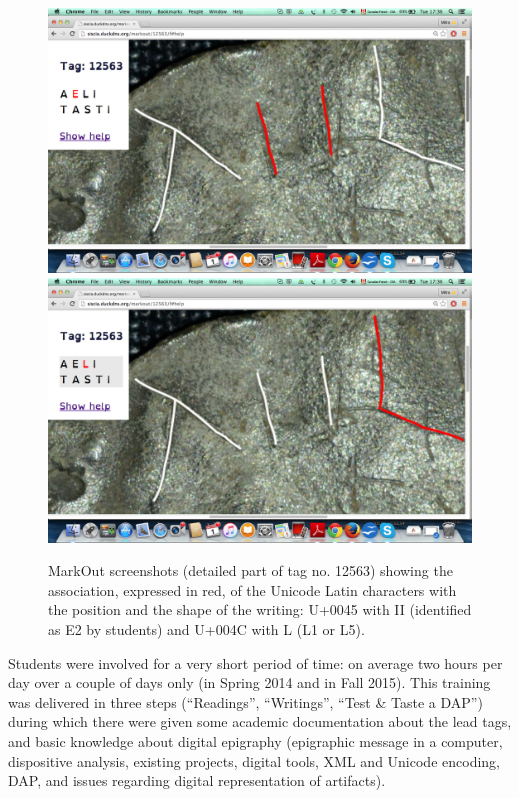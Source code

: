 \documentclass[amsthm,ebook]{saparticle}
\begin{document}
\begin{figure}[!bp]
\centering
\includegraphics[scale=0.10]{EAGLE16lameetalteaching-img003.png}
\includegraphics[scale=0.10]{EAGLE16lameetalteaching-img004.png}
\caption{MarkOut screenshots (detailed part of tag no. 12563) showing the association, expressed in red, of the Unicode
Latin characters with the position and the shape of the writing: U+0045 with II (identified as E2 by students) and
U+004C with L (L1 or L5).}
\label{fig:markout}
\end{figure}

Students were involved for a very short period of time: on average two hours per day over a couple of days only (in
Spring 2014 and in Fall 2015). This training was delivered in three steps (``Readings'', ``Writings'', ``Test \& Taste a
DAP'') during which there were given some academic documentation about the lead tags, and basic knowledge about digital
epigraphy (epigraphic message in a computer, dispositive analysis, existing projects, digital tools, XML and Unicode
encoding, DAP, and issues regarding digital representation of artifacts).
\end{document}
